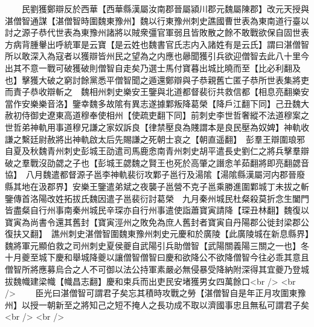 　　民劉獲鄭辯反於西華【西華縣漢屬汝南郡晉屬潁川郡元魏屬陳郡】改元天授與湛僧智通謀【湛僧智時圍魏東豫州】魏以行東豫州刺史譙國曹世表為東南道行臺以討之源子恭代世表為東豫州諸將以賊衆彊官軍弱且皆敗散之餘不敢戰欲保自固世表方病背腫轝出呼統軍是云寶【是云姓也魏書官氏志内入諸姓有是云氏】謂曰湛僧智所以敢深入為寇者以獲辯皆州民之望為之内應也曏聞獲引兵欲迎僧智去此八十里今出其不意一戰可破獲破則僧智自走矣乃選士馬付寶暮出城比曉而至【比必利翻及也】擊獲大破之窮討餘黨悉平僧智聞之遁還鄭辯與子恭親舊亡匿子恭所世表集將吏而責子恭收辯斬之　魏相州刺史樂安王鑒與北道都督裴衍共救信都【相息亮翻樂安當作安樂樂音洛】鑒幸魏多故隂有異志遂據鄴叛降葛榮【降戶江翻下同】己丑魏大赦初侍御史遼東高道穆奉使相州【使疏吏翻下同】前刺史李世哲奢縱不法道穆案之世哲弟神軌用事道穆兄謙之家奴訴良【律禁壓良為賤謂本是良民壓為奴婢】神軌收謙之繫廷尉赦將出神軌啟太后先賜謙之死朝士哀之【朝直遥翻】　彭羣王辯圍琅邪自夏及秋魏青州刺史彭城王劭遣司馬鹿悆南青州刺史胡平遣長史劉仁之將兵擊羣辯破之羣戰沒劭勰之子也【彭城王勰魏之賢王也死於高肇之譖悆羊茹翻將即亮翻勰音協】　八月魏遣都督源子邕李神軌裴衍攻鄴子邕行及湯隂【湯隂縣漢屬河内郡晉廢縣其地在汲郡界】安樂王鑒遣弟斌之夜襲子邕營不克子邕乘勝進圍鄴城丁未拔之斬鑒傳首洛陽改姓拓拔氏魏因遣子邕裴衍討葛榮　九月秦州城民杜粲殺莫折念生闔門皆盡粲自行州事南秦州城民辛琛亦自行州事遣使詣蕭寶寅請降【琛丑林翻】魏復以寶寅為尚書令還其舊封【寶寅涇州之敗免為庶人舊封者寶寅自丹陽郡公徙封梁郡公復扶又翻】　譙州刺史湛僧智圍魏東豫州刺史元慶和於廣陵【此廣陵城在新息縣界】魏將軍元顯伯救之司州刺史夏侯夔自武陽引兵助僧智【武陽關義陽三關之一也】冬十月夔至城下慶和舉城降夔以讓僧智僧智曰慶和欲降公不欲降僧智今往必乖其意且僧智所將應募烏合之人不可御以法公持軍素嚴必無侵暴受降納附深得其宜夔乃登城拔魏幟建梁幟【幟昌志翻】慶和束兵而出吏民安堵獲男女四萬餘口<br />
<br />
　　臣光曰湛僧智可謂君子矣忘其積時攻戰之勞【湛僧智自是年正月攻圍東豫州】以授一朝新至之將知己之短不掩人之長功成不取以濟國事忠且無私可謂君子矣<br />
<br />
